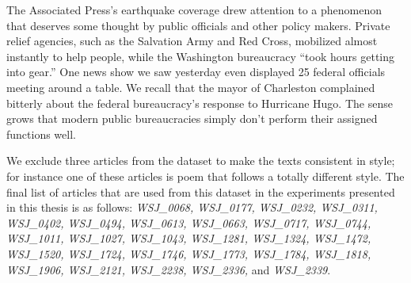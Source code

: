 \begin{examples}
	\label{ex:wsj-1818}
	The Associated Press's earthquake coverage drew attention to a phenomenon that deserves some thought by public officials and other policy makers. 
	Private relief agencies, such as the Salvation Army and Red Cross, mobilized almost instantly to help people, while the Washington bureaucracy ``took hours getting into gear.'' 
	One news show we saw yesterday even displayed 25 federal officials meeting around a table. 
	We recall that the mayor of Charleston complained bitterly about the federal bureaucracy's response to Hurricane Hugo. 
	The sense grows that modern public bureaucracies simply don't perform their assigned functions well. 
\end{examples}


We exclude three articles from the dataset to make the texts consistent in style; for instance one of these articles is poem that follows a totally different style. 
The final list of articles that are used from this dataset in the experiments presented in this thesis is as follows:
\emph{
WSJ\_0068,
WSJ\_0177,
WSJ\_0232,
WSJ\_0311,
WSJ\_0402,
WSJ\_0494,
WSJ\_0613,
WSJ\_0663,
WSJ\_0717,
WSJ\_0744,
WSJ\_1011,
WSJ\_1027,
WSJ\_1043,
WSJ\_1281,
WSJ\_1324,
WSJ\_1472,
WSJ\_1520,
WSJ\_1724,
WSJ\_1746,
WSJ\_1773,
WSJ\_1784,
WSJ\_1818,
WSJ\_1906,
WSJ\_2121,
WSJ\_2238,
WSJ\_2336, } and \emph{WSJ\_2339}.


